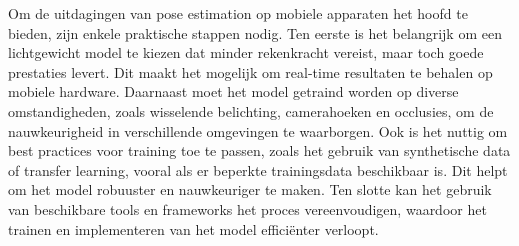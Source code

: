 Om de uitdagingen van pose estimation op mobiele apparaten het hoofd te bieden, zijn enkele praktische stappen nodig. Ten eerste is het belangrijk om een lichtgewicht model te kiezen dat minder rekenkracht vereist, maar toch goede prestaties levert. Dit maakt het mogelijk om real-time resultaten te behalen op mobiele hardware. Daarnaast moet het model getraind worden op diverse omstandigheden, zoals wisselende belichting, camerahoeken en occlusies, om de nauwkeurigheid in verschillende omgevingen te waarborgen.
\medskip
Ook is het nuttig om best practices voor training toe te passen, zoals het gebruik van synthetische data of transfer learning, vooral als er beperkte trainingsdata beschikbaar is. Dit helpt om het model robuuster en nauwkeuriger te maken. Ten slotte kan het gebruik van beschikbare tools en frameworks het proces vereenvoudigen, waardoor het trainen en implementeren van het model efficiënter verloopt.
